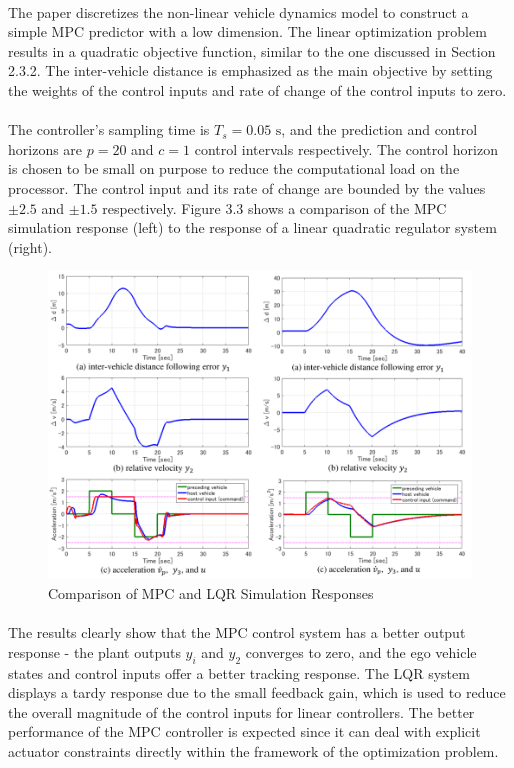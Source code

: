 \paragraph{}
The paper discretizes the non-linear vehicle dynamics model to construct a simple MPC predictor with a low dimension. The linear optimization problem results in a quadratic objective function, similar to the one discussed in Section 2.3.2. The inter-vehicle distance is emphasized as the main objective by setting the weights of the control inputs and rate of change of the control inputs to zero. 

\paragraph{}
The controller's sampling time is $T_s=0.05\text{ s}$, and the prediction and control horizons are $p = 20$ and $c = 1$ control intervals respectively. The control horizon is chosen to be small on purpose to reduce the computational load on the processor. The control input and its rate of change are bounded by the values $\pm 2.5$ and $\pm 1.5$ respectively. Figure 3.3 shows a comparison of the MPC simulation response (left) to the response of a linear quadratic regulator system (right).

\begin{figure}[H]\label{fig3.3}
\centering \includegraphics[width=\textwidth]{Images/paper2_model_performance.png}
\caption{Comparison of MPC and LQR Simulation Responses}
\end{figure}

\paragraph{}
The results clearly show that the MPC control system has a better output response - the plant outputs $y_i$ and $y_2$ converges to zero, and the ego vehicle states and control inputs offer a better tracking response. The LQR system displays a tardy response due to the small feedback gain, which is used to reduce the overall magnitude of the control inputs for linear controllers. The better performance of the MPC controller is expected since it can deal with explicit actuator constraints directly within the framework of the optimization problem. 

